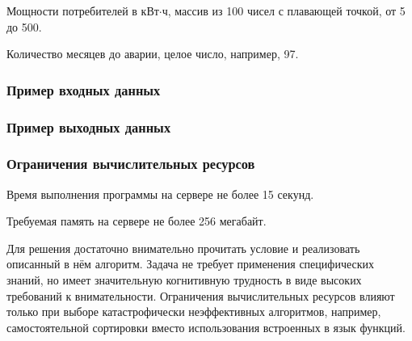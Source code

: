
Мощности потребителей в кВт$\cdot$ч, массив из 100 чисел с плавающей точкой, от 5 до 500.

\outputfmtSection

Количество месяцев до аварии, целое число, например, 97.

\subsubsection*{Пример входных данных}

\noindent[91.05173216589283, 346.59744306410516, 79.340611380049, 6.301441137920902, \\ 
34.63321051774173, 283.7442062865518, 462.85639563921933, 18.35969426088177, \\
114.42284118915013, 348.2511151684352, $\cdots$ ]

\subsubsection*{Пример выходных данных}


\subsubsection*{Ограничения вычислительных ресурсов}

Время выполнения программы на сервере не более 15 секунд.

Требуемая память на сервере не более 256 мегабайт.

\solutionSection

Для решения достаточно внимательно прочитать условие и реализовать описанный в нём алгоритм. Задача не требует применения специфических знаний, но имеет значительную когнитивную трудность в виде высоких требований к внимательности. Ограничения вычислительных ресурсов влияют только при выборе катастрофически неэффективных алгоритмов, например, самостоятельной сортировки вместо использования встроенных в язык функций.

